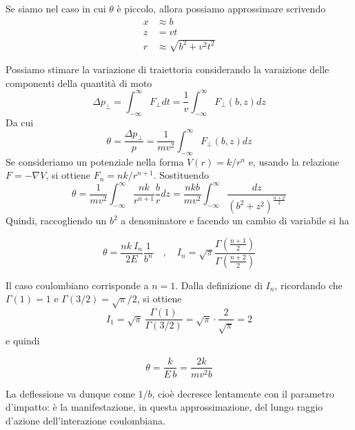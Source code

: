 Se siamo nel caso in cui $\theta$ è piccolo, allora possiamo approssimare scrivendo 
\begin{align*}
    x &\approx b\\
    z &= vt\\
    r &\approx \sqrt{b^2 + v^2 t^2}
\end{align*}

Possiamo stimare la variazione di traiettoria considerando la varaizione delle componenti della quantità di moto 
\begin{equation*}
    \Delta p_{\perp} = \int_{-\infty}^{\infty} F_{\perp} dt   = \frac{1}{v}\int_{-\infty}^{\infty} F_{\perp}(b,z) dz  
\end{equation*}
Da cui 
\begin{equation}
    \theta = \frac{\Delta p_\perp}{p} = \frac{1}{mv^2} \int_{-\infty}^{\infty} F_{\perp}(b,z) dz
\end{equation}
Se consideriamo un potenziale nella forma $V(r) = k/r^n$ e, usando la relazione $F = - \nabla V$, si ottiene $F_n = nk/r^{n+1}$. Sostituendo
\begin{equation*}
    \theta = \frac{1}{mv^2} \int_{-\infty}^{\infty} \frac{nk}{r^{n+1}} \frac{b}{r} dz = \frac{nkb}{mv^2} \int_{-\infty}^{\infty} \frac{dz}{(b^2 + z^2)^{\frac{n + 2}{2}}}
\end{equation*} 
Quindi, raccogliendo un $b^2$ a denominatore e facendo un cambio di variabile si ha 
\begin{tcolorbox}[colback=black!5!white, colframe=black!45!white, boxrule=0.8pt]
\begin{equation}
    \theta = \frac{nk \ I_n}{2E} \frac{1}{b^n} \quad ,\quad I_n = \sqrt{\pi}\frac{\Gamma\left(\frac{n+1}{2}\right)}{\Gamma\left(\frac{n+2}{2}\right)}
\end{equation}
\end{tcolorbox}

Il caso coulombiano corrisponde a $n = 1$. Dalla definizione di $I_n$, ricordando che $\Gamma(1) = 1$ e $\Gamma(3/2) = \sqrt{\pi}/2$, si ottiene
%
\begin{equation*}
    I_1 = \sqrt{\pi}\,\frac{\Gamma(1)}{\Gamma(3/2)} = \sqrt{\pi}\cdot\frac{2}{\sqrt{\pi}} = 2
\end{equation*}
e quindi

\begin{tcolorbox}[colback=black!5!white, colframe=black!45!white, boxrule=0.8pt]
\begin{equation}
    \theta = \frac{k}{E\,b} = \frac{2k}{mv^2 b}
    \label{eq:piccole_coulomb}
\end{equation}
\end{tcolorbox}
La deflessione va dunque come $1/b$, cioè decresce lentamente con il parametro d'impatto: è la manifestazione, in questa approssimazione, del lungo raggio d'azione dell'interazione coulombiana.\\

